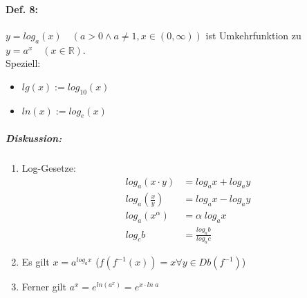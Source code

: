 \paragraph{Def. 8:}\parskp
$y=log_a (x) \quad (a>0\wedge a \not = 1, x\in (0,\infty))$ ist Umkehrfunktion zu $y=a^x \quad (x \in \mathbb{R})$.\\
Speziell: \begin{itemize}
\item $lg(x):= log_{10}(x)$
\item $ln(x):= log_e (x)$
\end{itemize}
\subparagraph{Diskussion:}
\begin{enumerate}
\item Log-Gesetze:
\begin{align*}
log_a(x \cdot y) &= log_a x + log_a y\\
log_a\left(\frac{x}{y}\right) &= log_a x - log_a y\\
log_a(x^{\alpha})&=\alpha \; log_a x\\
log_c b&=\frac{log_a b}{log_a c}
\end{align*}
\item Es gilt $x=a^{log_a x}$ \qquad ($f(f^{-1}(x))=x \forall y \in Db(f^{-1})$)
\item Ferner gilt $a^x=e^{ln(a^x)}=e^{x\cdot ln\;a}$
\end{enumerate}
